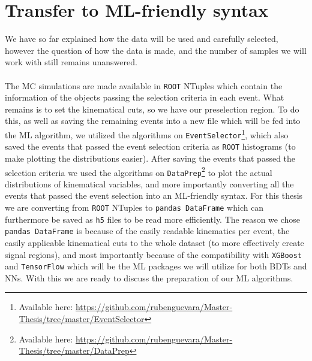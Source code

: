 \documentclass[12pt, a4paper]{book}
\begin{document}
\section{Transfer to ML-friendly syntax}
We have so far explained how the data will be used and carefully selected, however the question of how the data is made, and the number of samples we will work with still remains unanswered. \\
\\The MC simulations are made available in \verb|ROOT| \cite{ROOT} NTuples which contain the information of the objects passing the selection criteria in each event. What remains is to set the kinematical cuts, so we have our preselection region. 
To do this, as well as saving the remaining events into a new file which will be fed into the ML algorithm, we utilized the algorithms on \verb|EventSelector|\footnote{Available here: \href{https://github.com/rubenguevara/Master-Thesis/tree/master/EventSelector}{https://github.com/rubenguevara/Master-Thesis/tree/master/EventSelector}}, 
which also saved the events that passed the event selection criteria as \verb|ROOT| histograms (to make plotting the distributions easier). After saving the events that passed the selection criteria we used the algorithms on \verb|DataPrep|\footnote{Available here: \href{https://github.com/rubenguevara/Master-Thesis/tree/master/DataPrep}{https://github.com/rubenguevara/Master-Thesis/tree/master/DataPrep}} 
to plot the actual distributions of kinematical variables, and more importantly converting all the events that passed the event selection into an ML-friendly syntax. For this thesis we are converting from \verb|ROOT| NTuples to \verb|pandas DataFrame| \cite{pd.DataFrame} 
which can furthermore be saved as \verb|h5| files to be read more efficiently. The reason we chose \verb|pandas DataFrame| is because of the easily readable kinematics per event, the easily applicable kinematical cuts to the whole dataset 
(to more effectively create signal regions), and most importantly because of the compatibility with \verb|XGBoost| \cite{XGBoost} and \verb|TensorFlow| \cite{TensorFlow} which will be the ML packages we will utilize for both BDTs and NNs. 
With this we are ready to discuss the preparation of our ML algorithms.
\end{document}

